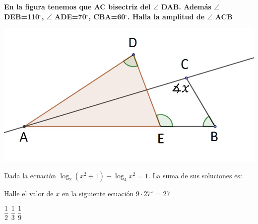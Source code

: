 \documentclass[11pt, addpoints, answers]{exam}
\begin{document}
\begin{questions}
		\vspace{0,5cm}
		
	\question[1] \textbf{En la figura tenemos que AC bisectriz del $\angle$ DAB. Además $\angle$ DEB=110$^\circ$, $\angle$ ADE=70$^\circ$, CBA=60$^\circ$. %
		  Halla la amplitud de $\angle$ ACB}
\begin{center}
		\includegraphics[width=0.7\linewidth]{fig1}
\end{center}
		  
\question[1]Dada la ecuación $\log_2{(x^{2}+1)}-\log_4{x^{2}}=1$. La suma de sus soluciones es:

\begin{oneparcheckboxes}
	
\end{oneparcheckboxes}
\question[1]Halle el valor de $x$ en la siguiente ecuación $9\cdot27^{x}=27$

\begin{oneparcheckboxes}
	
	\choice $\dfrac{1}{2}$ 
	\choice $\dfrac{1}{3}$ 
	\choice $\dfrac{1}{9}$ 
\end{oneparcheckboxes}		  
	\end{questions}
\end{document}
